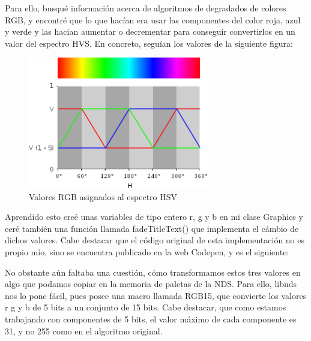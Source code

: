  \vspace{0.5cm}

Para ello, busqué información acerca de algoritmos de degradados de colores RGB, y encontré que lo que hacían era usar las componentes del color roja, azul y verde y las hacian aumentar o decrementar para conseguir convertirlos en un valor del espectro HVS. En concreto, seguían los valores de la siguiente figura:

 \vspace{0.5cm}

\begin{figure}[htbp]
\centering
  \includegraphics[width=0.7\textwidth]{archivos/rgbtohsv.png}
  \caption{Valores RGB asignados al espectro HSV}
  \label{fig:rgbtohsv}
\end{figure}

 \vspace{0.5cm}

Aprendido esto creé unas variables de tipo entero r, g y b en mi clase Graphics y ceré también una función llamada fadeTitleText() que implementa el cámbio de dichos valores. Cabe destacar que el código original de esta implementación no es propio mío, sino se encuentra publicado en la web Codepen, y es el siguiente:

 \vspace{0.5cm}

No obstante aún faltaba una cuestión, cómo transformamos estos tres valores en algo que podamos copiar en la memoria de paletas de la NDS. Para ello, libnds nos lo pone fácil, pues posee una macro llamada RGB15, que convierte los valores r g y b de 5 bits a un conjunto de 15 bits. Cabe destacar, que como estamos trabajando con componentes de 5 bits, el valor máximo de cada componente es 31, y no 255 como en el algoritmo original.

 \vspace{0.5cm}

